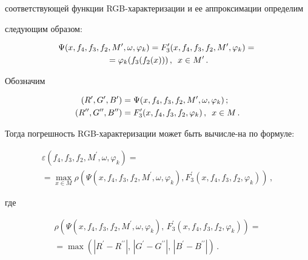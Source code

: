 соответствующей функции RGB-ха\-рак\-те\-ри\-за\-ции и ее аппроксимации определим


следующим образом:


\begin{multline*}


\Psi (x,f_4,f_3,f_2,


M^\prime,\omega,\varphi_k)=F^\prime_3(x,f_4,f_3,f_2,M^\prime,\varphi_k)={}\\


{}=\varphi_k(f_3(f_2(x)))\,,\enskip  x\in M^\prime\,.


\end{multline*}





Обозначим


\begin{align*}


(R^\prime,G^\prime,B^\prime)&=\Psi (x,f_4,f_3,f_2,M^\prime,\omega,\varphi_k)\,;\\


(R^{\prime\prime},G^{\prime\prime},B^{\prime\prime})&=F^\prime_3(x, f_4, f_3, f_2,\varphi_k)\,,


\enskip


x\in M\,.


\end{align*}


Тогда погрешность RGB-характеризации может быть вы\-чис\-ле-\linebreak на по формуле:


\begin{multline*}


\varepsilon (f_4, f_3, f_2, M^\prime, \omega, \varphi_k)={}\\


{}=\max\limits_{x\in M}


\rho\left(\Psi(x,f_4,f_3,f_2,M^\prime,\omega,\varphi_k),F^\prime_3(x,f_4,f_3,f_2,\varphi_k)\right)\,,


\end{multline*}


где


\begin{multline*}


\rho\left(\Psi(x,f_4,f_3,f_2,M^\prime,\omega,\varphi_k),\,F^\prime_3(x,f_4,f_3,f_2,\varphi_k)\right){}=\\


{}=\max\left(\left| R^\prime-R^{\prime\prime}\right| ,\,\left| G^\prime-


G^{\prime\prime}\right|,\,\left|B^\prime-B^{\prime\prime}\right|\right)\,.


\end{multline*}





